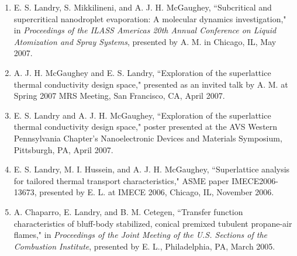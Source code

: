 \documentclass[letterpaper,12pt]{article}
\begin{document}
\begin{enumerate}
\item E. S. Landry, S. Mikkilineni, and A. J. H. McGaughey,
``Subcritical and supercritical nanodroplet evaporation: A molecular
dynamics investigation," in \textit{Proceedings of the ILASS
Americas 20th Annual Conference on Liquid Atomization and Spray
Systems}, presented by A. M. in Chicago, IL, May 2007.

\item A. J. H. McGaughey and E. S. Landry,
``Exploration of the superlattice thermal conductivity design
space," presented as an invited talk by A. M. at Spring 2007 MRS
Meeting, San Francisco, CA, April 2007.

\item E. S. Landry and A. J. H. McGaughey,
``Exploration of the superlattice thermal conductivity design
space," poster presented at the AVS Western Pennsylvania Chapter's
Nanoelectronic Devices and Materials Symposium, Pittsburgh, PA,
April 2007.

\item E. S. Landry, M. I. Hussein, and A. J. H. McGaughey,
``Superlattice analysis for tailored thermal transport
characteristics," ASME paper IMECE2006-13673, presented by E. L. at
IMECE 2006, Chicago, IL, November 2006.

\item A. Chaparro, E. Landry, and B. M. Cetegen,
``Transfer function characteristics of bluff-body stabilized,
conical premixed tubulent propane-air flames," in
\textit{Proceedings of the Joint Meeting of the U.S. Sections of the
Combustion Institute}, presented by E. L., Philadelphia, PA, March
2005.

\end{enumerate}

\clearpage





\end{document}
